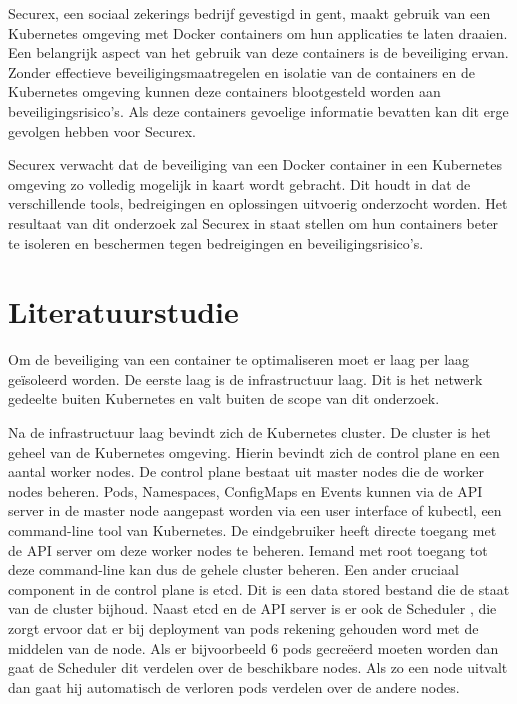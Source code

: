 Securex, een sociaal zekerings bedrijf gevestigd in gent, maakt gebruik van een Kubernetes omgeving met Docker containers om hun applicaties te laten draaien. Een belangrijk aspect van het gebruik van deze containers is de beveiliging ervan. Zonder effectieve beveiligingsmaatregelen en isolatie van de containers en de Kubernetes omgeving kunnen deze containers blootgesteld worden aan beveiligingsrisico's. Als deze containers gevoelige informatie bevatten kan dit erge gevolgen hebben voor Securex.

Securex verwacht dat de beveiliging van een Docker container in een Kubernetes omgeving zo volledig mogelijk in kaart wordt gebracht. Dit houdt in dat de verschillende tools, bedreigingen en oplossingen uitvoerig onderzocht worden. Het resultaat van dit onderzoek zal Securex in staat stellen om hun containers beter te isoleren en beschermen tegen bedreigingen en beveiligingsrisico's.



\section{Literatuurstudie}%
\label{sec:Literatuurstudie}

\autocite{Allclair2018} Om de beveiliging van een container te optimaliseren moet er laag per laag geïsoleerd worden. De eerste laag is de infrastructuur laag. Dit is het netwerk gedeelte buiten Kubernetes en valt buiten de scope van dit onderzoek. 


Na de infrastructuur laag bevindt zich de Kubernetes cluster. De cluster is het geheel van de Kubernetes omgeving. Hierin bevindt zich de control plane en een aantal worker nodes. 
De control plane bestaat uit master nodes die de worker nodes beheren. 
\autocite{kubernetesDocs-2022} Pods, Namespaces, ConfigMaps en Events kunnen via de API server in de master node aangepast worden via een user interface of kubectl, een command-line tool van Kubernetes. De eindgebruiker heeft directe toegang met de API server om deze worker nodes te beheren. Iemand met root toegang tot deze command-line kan dus de gehele cluster beheren. \autocite{Sayfan2020} Een ander cruciaal component in de control plane is etcd. Dit is een data stored bestand die de staat van de cluster bijhoud. Naast etcd en de API server is er ook de Scheduler \autocite{Huss2019}, die zorgt ervoor dat er bij deployment van pods rekening gehouden word met de middelen van de node. Als er bijvoorbeeld 6 pods gecreëerd moeten worden dan gaat de Scheduler dit verdelen over de beschikbare nodes. Als zo een node uitvalt dan gaat hij automatisch de verloren pods verdelen over de andere nodes.


